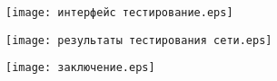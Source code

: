 \begin{landscape}
\begin{плакат}
	\texttt{[image: интерфейс тестирование.eps]}
	\label{pl9:image}      
\end{плакат}

\begin{плакат}
	\texttt{[image: результаты тестирования сети.eps]}
	\label{pl10:image}      
\end{плакат}

\begin{плакат}
	\texttt{[image: заключение.eps]}
	\label{pl11:image}      
\end{плакат}

\end{landscape}
